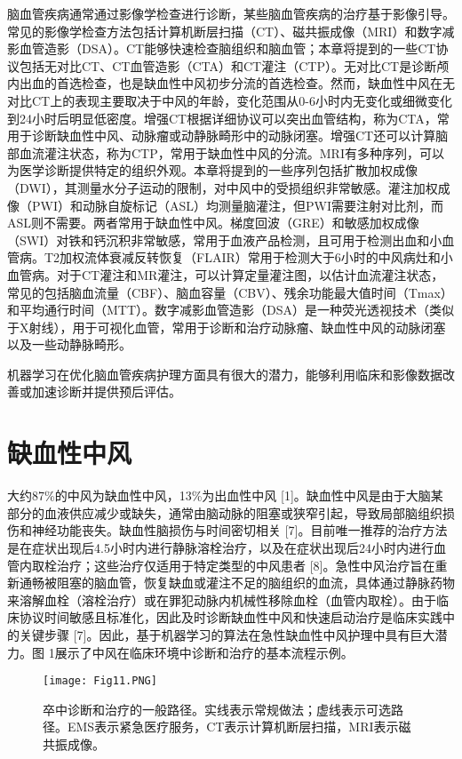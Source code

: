 \documentclass[11pt]{article}
\begin{document}
脑血管疾病通常通过影像学检查进行诊断，某些脑血管疾病的治疗基于影像引导。常见的影像学检查方法包括计算机断层扫描（CT）、磁共振成像（MRI）和数字减影血管造影（DSA）。CT能够快速检查脑组织和脑血管；本章将提到的一些CT协议包括无对比CT、CT血管造影（CTA）和CT灌注（CTP）。无对比CT是诊断颅内出血的首选检查，也是缺血性中风初步分流的首选检查。然而，缺血性中风在无对比CT上的表现主要取决于中风的年龄，变化范围从0-6小时内无变化或细微变化到24小时后明显低密度。增强CT根据详细协议可以突出血管结构，称为CTA，常用于诊断缺血性中风、动脉瘤或动静脉畸形中的动脉闭塞。增强CT还可以计算脑部血流灌注状态，称为CTP，常用于缺血性中风的分流。MRI有多种序列，可以为医学诊断提供特定的组织外观。本章将提到的一些序列包括扩散加权成像（DWI），其测量水分子运动的限制，对中风中的受损组织非常敏感。灌注加权成像（PWI）和动脉自旋标记（ASL）均测量脑灌注，但PWI需要注射对比剂，而ASL则不需要。两者常用于缺血性中风。梯度回波（GRE）和敏感加权成像（SWI）对铁和钙沉积非常敏感，常用于血液产品检测，且可用于检测出血和小血管病。T2加权流体衰减反转恢复（FLAIR）常用于检测大于6小时的中风病灶和小血管病。对于CT灌注和MR灌注，可以计算定量灌注图，以估计血流灌注状态，常见的包括脑血流量（CBF）、脑血容量（CBV）、残余功能最大值时间（Tmax）和平均通行时间（MTT）。数字减影血管造影（DSA）是一种荧光透视技术（类似于X射线），用于可视化血管，常用于诊断和治疗动脉瘤、缺血性中风的动脉闭塞以及一些动静脉畸形。

机器学习在优化脑血管疾病护理方面具有很大的潜力，能够利用临床和影像数据改善或加速诊断并提供预后评估。

\section{\kaishu 缺血性中风}

大约87\%的中风为缺血性中风，13\%为出血性中风 [1]。缺血性中风是由于大脑某部分的血液供应减少或缺失，通常由脑动脉的阻塞或狭窄引起，导致局部脑组织损伤和神经功能丧失。缺血性脑损伤与时间密切相关 [7]。目前唯一推荐的治疗方法是在症状出现后4.5小时内进行静脉溶栓治疗，以及在症状出现后24小时内进行血管内取栓治疗；这些治疗仅适用于特定类型的中风患者 [8]。急性中风治疗旨在重新通畅被阻塞的脑血管，恢复缺血或灌注不足的脑组织的血流，具体通过静脉药物来溶解血栓（溶栓治疗）或在罪犯动脉内机械性移除血栓（血管内取栓）。由于临床协议时间敏感且标准化，因此及时诊断缺血性中风和快速启动治疗是临床实践中的关键步骤 [7]。因此，基于机器学习的算法在急性缺血性中风护理中具有巨大潜力。图 1展示了中风在临床环境中诊断和治疗的基本流程示例。

\begin{figure}[!htb]
	\centering
	\texttt{[image: Fig11.PNG]}
	\caption{\kaishu 卒中诊断和治疗的一般路径。实线表示常规做法；虚线表示可选路径。EMS表示紧急医疗服务，CT表示计算机断层扫描，MRI表示磁共振成像。}
	\label{Fig1}
\end{figure}
\end{document}

